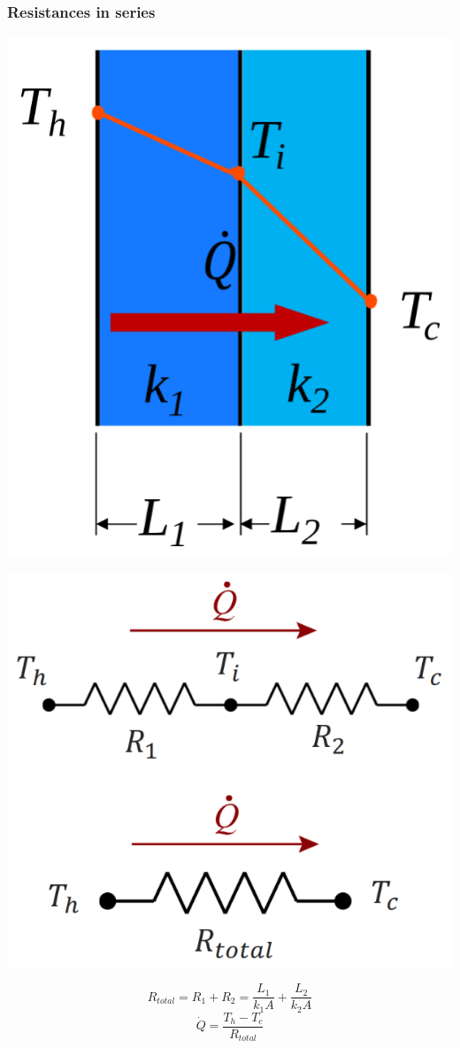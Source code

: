 \documentclass[11pt]{article}
\begin{document}
\subsubsection{Resistances in series}
\label{sec:org7eac41e}
\begin{center}
\includegraphics[scale=0.7]{./images/thermal-resistances-in-series.png}
\end{center}
\begin{center}
\includegraphics[scale=0.7]{./images/thermal-resistances-in-series-electrical-analogy.png}
\end{center}
\[R_{total} = R_1 + R_2 = \frac{L_1}{k_1 A} + \frac{L_2}{k_2 A}\]
\[\dot{Q} = \frac{T_h - T_c}{R_{total}}\]
\end{document}
